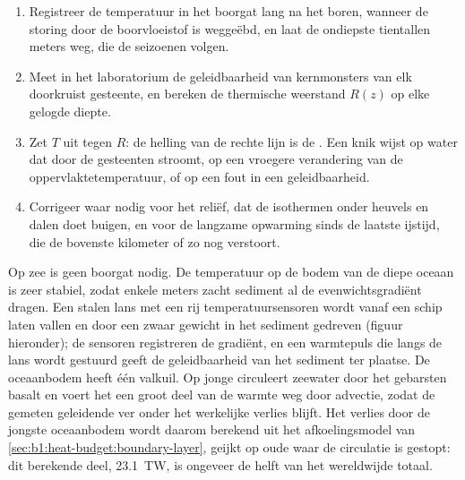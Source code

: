 \begin{method}\label{met:b1:heat-budget:borehole}
\begin{enumerate}
  \item Registreer de temperatuur in het boorgat lang na het boren, wanneer de storing door de boorvloeistof is weggeëbd, en laat de ondiepste tientallen meters weg, die de seizoenen volgen.
  \item Meet in het laboratorium de geleidbaarheid van kernmonsters van elk doorkruist gesteente, en bereken de thermische weerstand $R(z)$ op elke gelogde diepte.
  \item Zet $T$ uit tegen $R$: de helling van de rechte lijn is de . Een knik wijst op water dat door de gesteenten stroomt, op een vroegere verandering van de oppervlaktetemperatuur, of op een fout in een geleidbaarheid.
  \item Corrigeer waar nodig voor het reliëf, dat de isothermen onder heuvels en dalen doet buigen, en voor de langzame opwarming sinds de laatste ijstijd, die de bovenste kilometer of zo nog verstoort.
\end{enumerate}
\end{method}

Op zee is geen boorgat nodig. De temperatuur op de bodem van de diepe oceaan is zeer stabiel, zodat enkele meters zacht sediment al de evenwichtsgradiënt dragen. Een stalen lans met een rij temperatuursensoren wordt vanaf een schip laten vallen en door een zwaar gewicht in het sediment gedreven (figuur hieronder); de sensoren registreren de gradiënt, en een warmtepuls die langs de lans wordt gestuurd geeft de geleidbaarheid van het sediment ter plaatse.
De oceaanbodem heeft één valkuil. Op jonge  circuleert zeewater door het gebarsten basalt en voert het een groot deel van de warmte weg door advectie, zodat de gemeten geleidende  ver onder het werkelijke verlies blijft. Het verlies door de jongste oceaanbodem wordt daarom berekend uit het afkoelingsmodel van \cref{sec:b1:heat-budget:boundary-layer}, geijkt op oude  waar de circulatie is gestopt: dit berekende deel, \qty{23.1}{TW}, is ongeveer de helft van het wereldwijde totaal. %

